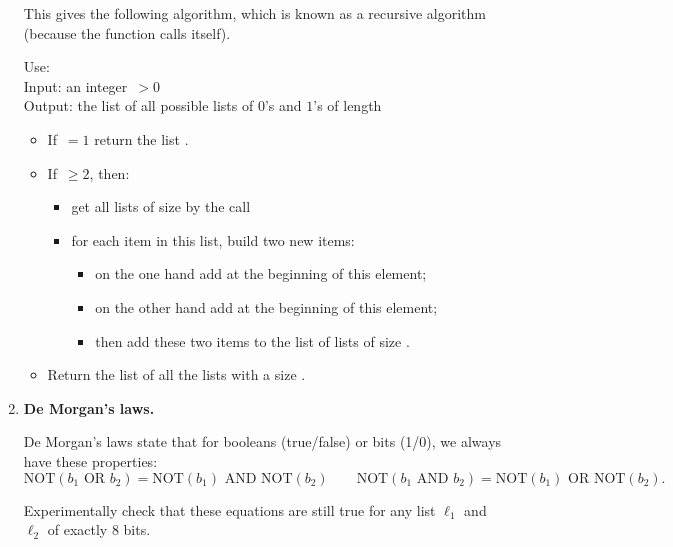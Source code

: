 \documentclass[11pt,class=report,crop=false]{standalone}
\begin{document}
\begin{activite}
\begin{enumerate}
  This gives the following algorithm, which is known as a recursive algorithm (because the function calls itself).
  \begin{algorithme}
  Use: \\
  Input: an integer \,$>0$\\
  Output: the list of all possible lists of $0$'s and $1$'s of length 

  \begin{itemize}
    \item If \,$=1$ return the list \ci{[ [0], [1] ]}.     
    \item If \,$\ge2$, then:
    \begin{itemize}
      \item get all lists of size  by the call 
      \item for each item in this list, build two new items:
       \begin{itemize} 
         \item on the one hand add  at the beginning of this element;
         \item on the other hand add  at the beginning of this element;
         \item then add these two items to the list of lists of size .
       \end{itemize}      
    \end{itemize}
    
    \item Return the list of all the lists with a size .
  \end{itemize}     
 \end{algorithme}  
  
    \item \textbf{De Morgan's laws.} 
    
    De Morgan's laws state that for booleans (true/false) or bits (1/0), we always have these properties:
    $$\text{NOT}( b_1 \text{ OR } b_2 ) = 
    \text{NOT}( b_1 )  \text{ AND } \text{NOT}(b_2)
    \qquad
    \text{NOT}( b_1 \text{ AND } b_2 ) = 
    \text{NOT}( b_1 )  \text{ OR } \text{NOT}(b_2).$$
    
    Experimentally check that these equations are still true for any list $\ell_1$ and $\ell_2$ of exactly $8$ bits.
    
\end{enumerate}

\end{activite}
\end{document}
